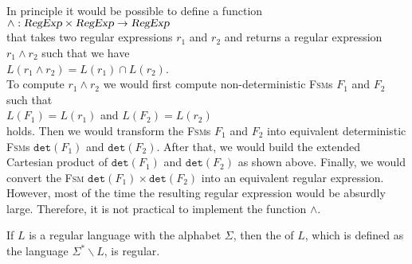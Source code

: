 \remarkEng
In principle it would be possible to define a function
\\[0.2cm]
\hspace*{1.3cm}
$\wedge: \textsl{RegExp} \times \textsl{RegExp} \rightarrow \textsl{RegExp}$
\\[0.2cm]
that takes two regular expressions $r_1$ and $r_2$ and returns a regular expression  $r_1 \wedge r_2$ such that
we have
\\[0.2cm]
\hspace*{1.3cm}
$L(r_1 \wedge r_2) = L(r_1) \cap L(r_2)$.
\\[0.2cm]
To compute $r_1 \wedge r_2$ we would first compute non-deterministic \textsc{Fsm}s  $F_1$ and $F_2$ such that
\\[0.2cm]
\hspace*{1.3cm}
$L(F_1) = L(r_1)$ \quad and \quad $L(F_2) = L(r_2)$
\\[0.2cm] 
holds.  Then we would transform the \textsc{Fsm}s $F_1$ and $F_2$ into equivalent deterministic 
\textsc{Fsm}s $\mathtt{det}(F_1)$ and $\mathtt{det}(F_2)$.  After that, we would build
the extended Cartesian product of $\mathtt{det}(F_1)$ and $\mathtt{det}(F_2)$ as shown above. 
Finally, we would convert the \textsc{Fsm} $\mathtt{det}(F_1) \times\mathtt{det}(F_2)$ into an equivalent
regular expression.  However, most of the time the resulting regular expression would be absurdly large. 
Therefore, it is not practical to implement the function $\wedge$.
\eox


\begin{Proposition}
  If $L$ is a regular language with the alphabet $\Sigma$, then the  
  of $L$, which is defined as the language $\Sigma^* \backslash L$, is regular.
\end{Proposition}

